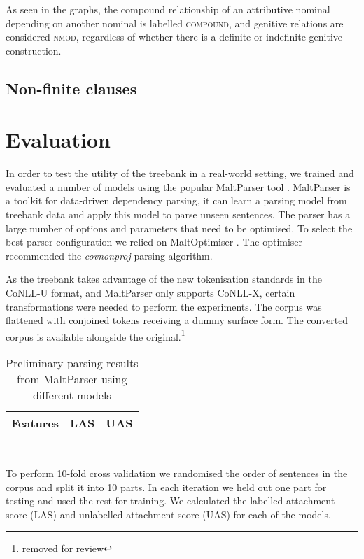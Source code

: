 \documentclass[a4paper,11pt, onecolumn,twoside]{article}
\newcommand{\udtag}[1]{{\ll \textsc{#1}}}
\begin{document}
As seen in the graphs, the compound relationship of an attributive nominal depending on another nominal is labelled \udtag{compound}, and genitive relations are considered \udtag{nmod}, regardless of whether there is a definite or indefinite genitive construction.


\subsection{Non-finite clauses}

\section{Evaluation}


In order to test the utility of the treebank in a real-world setting, we trained
and evaluated a number of models using the popular MaltParser tool \parencite{nivre07}.
MaltParser is a toolkit for data-driven dependency parsing, it can learn a parsing
model from treebank data and apply this model to parse unseen sentences. The parser
has a large number of options and parameters that need to be optimised.
To select the best parser configuration we relied on
MaltOptimiser \parencite{ballesteros15}. The optimiser recommended the \emph{covnonproj}
parsing algorithm.

As the treebank takes advantage of the new tokenisation standards in the CoNLL-U format,
and MaltParser only supports CoNLL-X, certain transformations were needed to perform
the experiments. The corpus was flattened with conjoined tokens receiving a dummy
surface form. The converted corpus is available alongside the original.\footnote{\url{removed for review}}


\begin{table}
  \centering
  \begin{tabular}{|l|r|r|}
    \hline
    \textbf{Features} & \textbf{LAS} & \textbf{UAS} \\
    \hline
     - & - & - \\
    \hline
  \end{tabular}
  \caption{Preliminary parsing results from MaltParser using different models}
  \label{table:eval}
\end{table}

To perform 10-fold cross validation we randomised the order of sentences in the corpus
and split it into 10 parts. In each iteration we held out one part for testing and used
the rest for training. We calculated the labelled-attachment score (LAS) and
unlabelled-attachment score (UAS) for each of the models.
\end{document}
